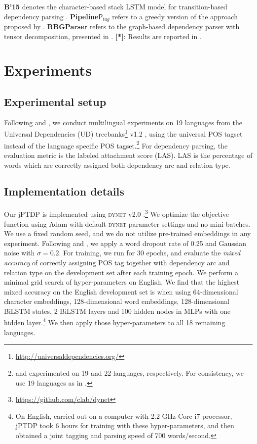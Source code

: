 \documentclass[11pt,letterpaper]{article}
\begin{document}
\begin{table*}[t]
{\textbf{B'15} denotes the   character-based stack LSTM model for transition-based dependency  parsing  \citep{ballesterosEMNLP}. \textbf{Pipeline$\mathsf{P}_{tag}$} refers to a greedy version of the approach proposed by \citet{alberti-EtAl:2015:EMNLP}. 
\textbf{RBGParser}  refers to the graph-based  dependency parser with tensor decomposition, presented in \citet{lei-EtAl:2014:P14-1}.  \textbf{[*]}: Results are reported in \citet{zhang-weiss:2016:P16-1}.  }
\label{tab:ud-results}
\end{table*}


\section{Experiments}

\subsection{Experimental setup}

Following \citet{zhang-weiss:2016:P16-1} and \citet{plankP16}, we conduct  multilingual experiments on 19 languages from the Universal Dependencies (UD) treebanks\footnote{\url{http://universaldependencies.org/}}  v1.2 \citep{11234/1-1548}, 
using the universal POS tagset  \citep{PetrovDM12}  instead of the language specific
POS tagset.\footnote{ \citet{zhang-weiss:2016:P16-1}  and \citet{plankP16} experimented on 19 and 22 languages, respectively. For consistency, we use 19 languages as in \citet{zhang-weiss:2016:P16-1}.}
For dependency parsing, the evaluation metric is the labeled attachment score (LAS). LAS  is the percentage of words which are correctly assigned both dependency arc and relation type. 

\subsection{Implementation details}\label{ssec:impl}

Our jPTDP is implemented using  \textsc{dynet} v2.0 \citep{dynet}.\footnote{\url{https://github.com/clab/dynet}} We optimize the objective function using Adam  \citep{KingmaB14} with default \textsc{dynet} parameter settings and no mini-batches. We  use a fixed random seed, and we do not utilize pre-trained embeddings in any experiment. Following \citet{TACL885} and \citet{plankP16}, we apply a word dropout rate of 0.25 and Gaussian noise with $\sigma = 0.2$. 
For training, we run for 30 epochs, and  evaluate the \textit{mixed accuracy} of correctly assigning
POS tag together with dependency arc and relation type on the development set after each training epoch. 
We perform a minimal grid search of hyper-parameters on English. We find that the highest mixed accuracy on the English development set is when using 64-dimensional character embeddings, 128-dimensional word embeddings,   128-dimensional BiLSTM states, 2 BiLSTM layers and  100 hidden nodes in MLPs with one hidden layer.\footnote{On English, carried out on a computer with 2.2 GHz Core i7 processor, jPTDP took  6 hours for training with these hyper-parameters,  and then obtained a joint tagging and parsing speed of 700 words/second.} We then apply those hyper-parameters to all 18 remaining languages. 
\end{document}
